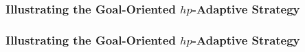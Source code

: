 \begin{frame}[c]
	\frametitle{Illustrating the Goal-Oriented $hp$-Adaptive Strategy}
	\begin{figure}[t!]
	\end{figure}
\end{frame}

\begin{frame}[c]
	\frametitle{Illustrating the Goal-Oriented $hp$-Adaptive Strategy}
\end{frame}